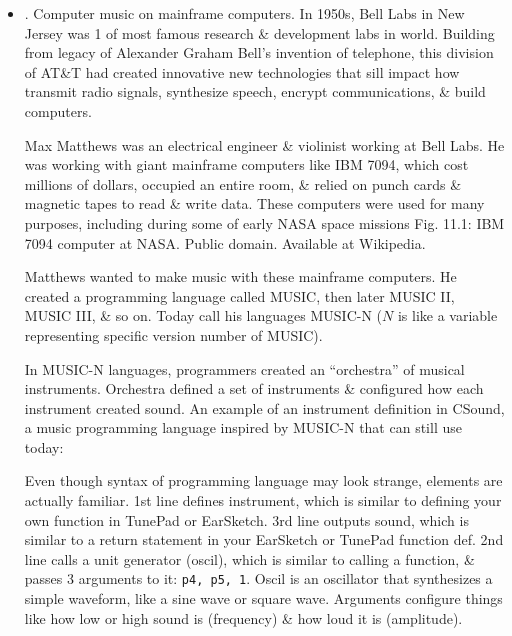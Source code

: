 \documentclass{article}
\begin{document}
\begin{itemize}
\begin{itemize}
		{\it Does computer create music in real time?} Early computers often took hours to generate a few secs of sound, \& even today, computer music applications that use ML \& AI can take days to analyze large datasets. Many computer music applications, like musical instruments, require immediate, real-time responses, while with other applications, like composition, real-time operation may not always be as important.
		
		Consider these 3 questions as look at some of earliest examples of computer music.
		\item {. Computer music on mainframe computers.} In 1950s, Bell Labs in New Jersey was 1 of most famous research \& development labs in world. Building from legacy of {\sc Alexander Graham Bell}'s invention of telephone, this division of AT\&T had created innovative new technologies that sill impact how transmit radio signals, synthesize speech, encrypt communications, \& build computers.
		
		{\sc Max Matthews} was an electrical engineer \& violinist working at Bell Labs. He was working with giant mainframe computers like IBM 7094, which cost millions of dollars, occupied an entire room, \& relied on punch cards \& magnetic tapes to read \& write data. These computers were used for many purposes, including during some of early NASA space missions {\sf Fig. 11.1: IBM 7094 computer at NASA. Public domain. Available at Wikipedia.}
		
		{\sc Matthews} wanted to make music with these mainframe computers. He created a programming language called MUSIC, then later MUSIC II, MUSIC III, \& so on. Today call his languages MUSIC-N ($N$ is like a variable representing specific version number of MUSIC).
		
		In MUSIC-N languages, programmers created an ``orchestra'' of musical instruments. Orchestra defined a set of instruments \& configured how each instrument created sound. An example of an instrument definition in CSound, a music programming language inspired by MUSIC-N that can still use today: {\sf[Codes]}
		
		Even though syntax of programming language may look strange, elements are actually familiar. 1st line defines instrument, which is similar to defining your own function in TunePad or EarSketch. 3rd line outputs sound, which is similar to a return statement in your EarSketch or TunePad function def. 2nd line calls a unit generator (oscil), which is similar to calling a function, \& passes 3 arguments to it: {\tt p4, p5, 1}. Oscil is an oscillator that synthesizes a simple waveform, like a sine wave or square wave. Arguments configure things like how low or high sound is (frequency) \& how loud it is (amplitude).
		

\end{itemize}
\end{itemize}
\end{document}
